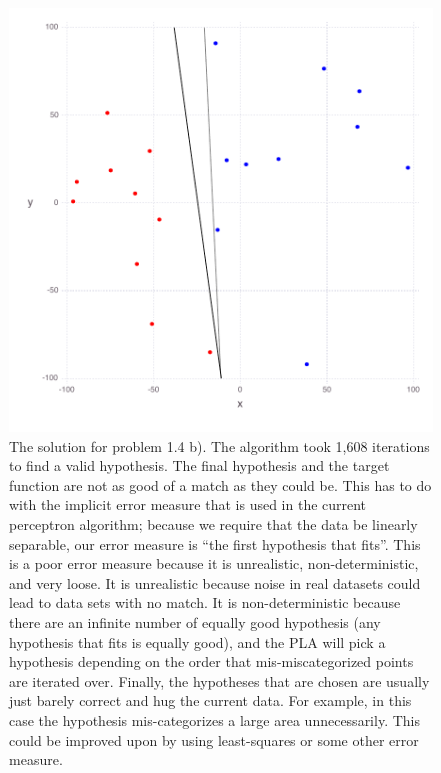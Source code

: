 \documentclass[11pt,letterpaper]{article}
\begin{document}
\begin{figure}
	\centering
    \includegraphics[width=\textwidth]{problem_1_4b.pdf}
	\caption{The solution for problem 1.4 b).  The algorithm took 1,608 iterations to find a valid hypothesis. The final hypothesis and the target function are not as good of a match as they could be.  This has to do with the implicit error measure that is used in the current perceptron algorithm; because we require that the data be linearly separable, our error measure is ``the first hypothesis that fits''.  This is a poor error measure because it is unrealistic, non-deterministic, and very loose.  It is unrealistic because noise in real datasets could lead to data sets with no match.  It is non-deterministic because there are an infinite number of equally good hypothesis (any hypothesis that fits is equally good), and the PLA will pick a hypothesis depending on the order that mis-miscategorized points are iterated over.  Finally, the hypotheses that are chosen are usually just barely correct and hug the current data.  For example, in this case the hypothesis mis-categorizes a large area unnecessarily.  This could be improved upon by using least-squares or some other error measure.}
\end{figure}
\end{document}
